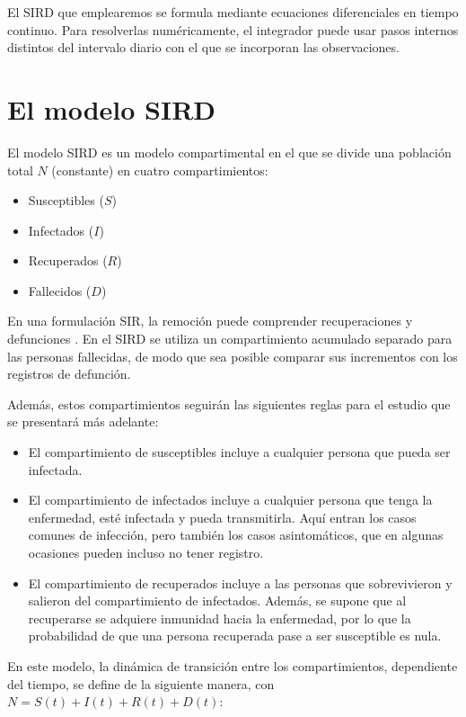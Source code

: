 El SIRD que emplearemos se formula mediante ecuaciones diferenciales en tiempo continuo. Para resolverlas numéricamente, el integrador puede usar pasos internos distintos del intervalo diario con el que se incorporan las observaciones.

\section{El modelo SIRD}
\label{sec:modelo-sird}

El modelo SIRD es un modelo compartimental en el que se divide una población total $N$ (constante) en cuatro compartimientos:

\begin{itemize}
    \item Susceptibles ($S$)
    \item Infectados ($I$)
    \item Recuperados ($R$)
    \item Fallecidos ($D$)
\end{itemize}

En una formulación SIR, la remoción puede comprender recuperaciones y defunciones \cite{kermack1927}. En el SIRD se utiliza un compartimiento acumulado separado para las personas fallecidas, de modo que sea posible comparar sus incrementos con los registros de defunción.

Además, estos compartimientos seguirán las siguientes reglas para el estudio que se presentará más adelante:

\begin{itemize}
    \item El compartimiento de susceptibles incluye a cualquier persona que pueda ser infectada.
    \item El compartimiento de infectados incluye a cualquier persona que tenga la enfermedad, esté infectada y pueda transmitirla. Aquí entran los casos comunes de infección, pero también los casos asintomáticos, que en algunas ocasiones pueden incluso no tener registro.
    \item El compartimiento de recuperados incluye a las personas que sobrevivieron y salieron del compartimiento de infectados. Además, se supone que al recuperarse se adquiere inmunidad hacia la enfermedad, por lo que la probabilidad de que una persona recuperada pase a ser susceptible es nula.
\end{itemize}

En este modelo, la dinámica de transición entre los compartimientos, dependiente del tiempo, se define de la siguiente manera, con $N = S(t) + I(t) + R(t) + D(t)$:



